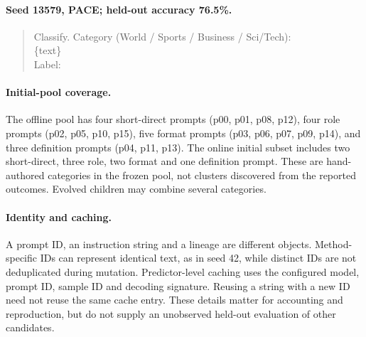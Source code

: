 \paragraph{Seed 13579, PACE; held-out accuracy 76.5\%.}

\begin{quote}\small\ttfamily\raggedright
Classify. Category (World / Sports / Business / Sci/Tech):\\
\{text\}\\
Label:
\end{quote}

\paragraph{Initial-pool coverage.}
The offline pool has four short-direct prompts (p00, p01, p08, p12), four role
prompts (p02, p05, p10, p15), five format prompts (p03, p06, p07, p09, p14), and
three definition prompts (p04, p11, p13). The online initial subset includes two
short-direct, three role, two format and one definition prompt. These are
hand-authored categories in the frozen pool, not clusters discovered from the
reported outcomes. Evolved children may combine several categories.

\paragraph{Identity and caching.}
A prompt ID, an instruction string and a lineage are different objects.
Method-specific IDs can represent identical text, as in seed 42, while distinct
IDs are not deduplicated during mutation. Predictor-level caching uses the configured
model, prompt ID, sample ID and decoding signature. Reusing a string with a new
ID need not reuse the same cache entry. These details matter for accounting and
reproduction, but do not supply an unobserved held-out evaluation of other
candidates.
